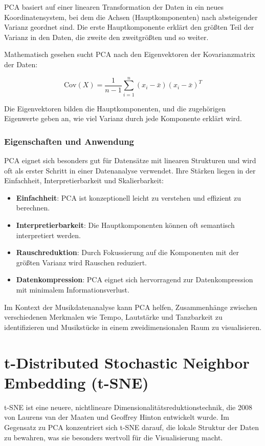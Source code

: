 PCA basiert auf einer linearen Transformation der Daten in ein neues Koordinatensystem, bei dem die Achsen (Hauptkomponenten) nach absteigender Varianz geordnet sind. Die erste Hauptkomponente erklärt den größten Teil der Varianz in den Daten, die zweite den zweitgrößten und so weiter.

Mathematisch gesehen sucht PCA nach den Eigenvektoren der Kovarianzmatrix der Daten:

\[
\text{Cov}(X) = \frac{1}{n-1} \sum_{i=1}^{n} (x_i - \bar{x})(x_i - \bar{x})^T
\]

Die Eigenvektoren bilden die Hauptkomponenten, und die zugehörigen Eigenwerte geben an, wie viel Varianz durch jede Komponente erklärt wird.

\subsubsection{Eigenschaften und Anwendung}

PCA eignet sich besonders gut für Datensätze mit linearen Strukturen und wird oft als erster Schritt in einer Datenanalyse verwendet. Ihre Stärken liegen in der Einfachheit, Interpretierbarkeit und Skalierbarkeit:

\begin{itemize}
    \item \textbf{Einfachheit}: PCA ist konzeptionell leicht zu verstehen und effizient zu berechnen.
    \item \textbf{Interpretierbarkeit}: Die Hauptkomponenten können oft semantisch interpretiert werden.
    \item \textbf{Rauschreduktion}: Durch Fokussierung auf die Komponenten mit der größten Varianz wird Rauschen reduziert.
    \item \textbf{Datenkompression}: PCA eignet sich hervorragend zur Datenkompression mit minimalem Informationsverlust.
\end{itemize}

Im Kontext der Musikdatenanalyse kann PCA helfen, Zusammenhänge zwischen verschiedenen Merkmalen wie Tempo, Lautstärke und Tanzbarkeit zu identifizieren und Musikstücke in einem zweidimensionalen Raum zu visualisieren.

\section{t-Distributed Stochastic Neighbor Embedding (t-SNE)}

t-SNE ist eine neuere, nichtlineare Dimensionalitätsreduktionstechnik, die 2008 von Laurens van der Maaten und Geoffrey Hinton entwickelt wurde. Im Gegensatz zu PCA konzentriert sich t-SNE darauf, die lokale Struktur der Daten zu bewahren, was sie besonders wertvoll für die Visualisierung macht.

